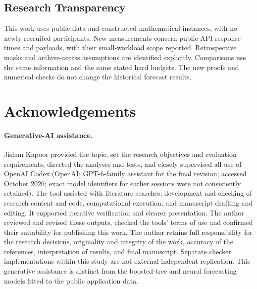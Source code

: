\documentclass[12pt]{article}
\begin{document}
\subsection*{Research Transparency}
This work uses public data and constructed mathematical instances, with
no newly recruited participants. New measurements concern public API
response times and payloads, with their small-workload scope reported. Retrospective masks and
archive-access assumptions are identified explicitly. Comparisons use
the same information and the same stated hard budgets. The new proofs
and numerical checks do not change the historical forecast results.

\section*{Acknowledgements}
\paragraph{Generative-AI assistance.}
Jishan Kapoor provided the topic, set the research objectives and evaluation
requirements, directed the analyses and tests, and closely supervised all
use of OpenAI Codex (OpenAI; GPT-6-family assistant for the final revision;
accessed October 2026; exact model identifiers for earlier sessions were
not consistently retained). The tool assisted with literature searches,
development and checking of research content and code, computational
execution, and manuscript drafting and editing. It supported iterative
verification and clearer presentation. The author reviewed and revised
these outputs, checked the tools' terms of use and confirmed their suitability
for publishing this work. The author retains full responsibility for the
research decisions, originality and integrity of the work, accuracy of the
references, interpretation of results, and final manuscript. Separate checker
implementations within this study are not external independent replication.
This generative assistance is distinct from the boosted-tree and neural
forecasting models fitted to the public application data.
\end{document}

